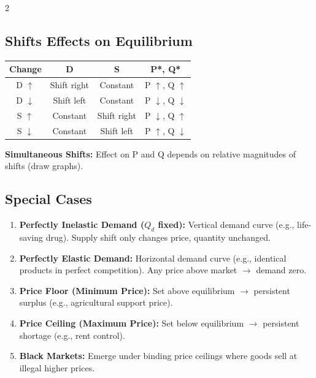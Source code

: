 \documentclass[10pt,a4paper]{article}
\begin{document}
\begin{multicols}{2}
\subsection*{Shifts Effects on Equilibrium}
\begin{center}
\begin{tabular}{|c|c|c|c|}
\hline
\textbf{Change} & \textbf{D} & \textbf{S} & \textbf{P*, Q*} \\
\hline
D $\uparrow$ & Shift right & Constant & P $\uparrow$, Q $\uparrow$ \\
D $\downarrow$ & Shift left & Constant & P $\downarrow$, Q $\downarrow$ \\
S $\uparrow$ & Constant & Shift right & P $\downarrow$, Q $\uparrow$ \\
S $\downarrow$ & Constant & Shift left & P $\uparrow$, Q $\downarrow$ \\
\hline
\end{tabular}
\end{center}
\textbf{Simultaneous Shifts:} Effect on P and Q depends on relative magnitudes of shifts (draw graphs).

\subsection*{Special Cases}
\begin{enumerate}[leftmargin=*,nosep]
    \item \textbf{Perfectly Inelastic Demand ($Q_d$ fixed):} Vertical demand curve (e.g., life-saving drug). Supply shift only changes price, quantity unchanged.
    \item \textbf{Perfectly Elastic Demand:} Horizontal demand curve (e.g., identical products in perfect competition). Any price above market $\to$ demand zero.
    \item \textbf{Price Floor (Minimum Price):} Set above equilibrium $\to$ persistent surplus (e.g., agricultural support price).
    \item \textbf{Price Ceiling (Maximum Price):} Set below equilibrium $\to$ persistent shortage (e.g., rent control).
    \item \textbf{Black Markets:} Emerge under binding price ceilings where goods sell at illegal higher prices.
\end{enumerate}


\end{multicols}
\end{document}
